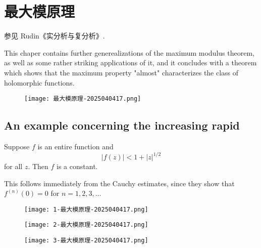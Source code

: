 \section{最大模原理}

参见 Rudin《实分析与复分析》.

This chaper contains further generealizations of the maximum modulus theorem, as well as some rather striking applications of it, and it concludes with a theorem which shows that the maximum property "almost" characterizes the class of holomorphic functions.

\begin{figure}[H]
\centering
\texttt{[image: 最大模原理-2025040417.png]}
\label{}
\end{figure}

\subsection{An example concerning the increasing rapid}

Suppose $f$ is an entire function and
\[
\lvert f(z) \rvert <1+\lvert z \rvert ^{1/2 }
\]
for all $z$. Then $f$ is a constant.

This follows immediately from the Cauchy estimates, since they show that $f^{(n)}(0)=0$ for $n=1,2,3,\dots$

\begin{figure}[H]
\centering
\texttt{[image: 1-最大模原理-2025040417.png]}
\label{}
\end{figure}

\begin{figure}[H]
\centering
\texttt{[image: 2-最大模原理-2025040417.png]}
\label{}
\end{figure}

\begin{figure}[H]
\centering
\texttt{[image: 3-最大模原理-2025040417.png]}
\label{}
\end{figure}
